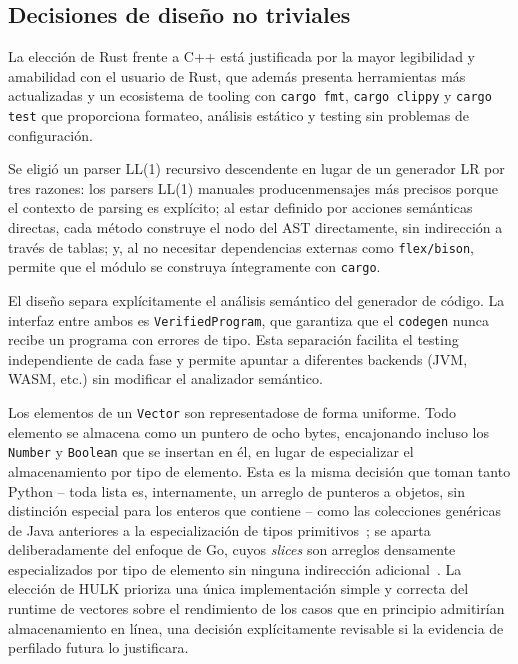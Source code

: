 \documentclass[12pt, a4paper]{article}
\begin{document}
\subsection{Decisiones de dise\~{n}o no triviales}

La elecci\'{o}n de Rust frente a C++ est\'{a} justificada por la mayor legibilidad y amabilidad con el usuario de Rust, que además presenta herramientas más actualizadas y un ecosistema de tooling con \texttt{cargo fmt}, \texttt{cargo clippy} y \texttt{cargo test} que proporciona formateo, an\'{a}lisis est\'{a}tico y testing sin problemas de configuraci\'{o}n.

Se eligi\'{o} un parser LL(1) recursivo descendente en lugar de un generador LR por tres razones: los parsers LL(1) manuales producenmensajes m\'{a}s precisos porque el contexto de parsing es expl\'{i}cito; al estar definido por acciones sem\'{a}nticas directas, cada m\'{e}todo construye el nodo del AST directamente, sin indirecci\'{o}n a trav\'{e}s de tablas; y, al no necesitar dependencias externas como \texttt{flex/bison}, permite que el módulo se construya \'{i}ntegramente con \texttt{cargo}.


El dise\~{n}o separa expl\'{i}citamente el an\'{a}lisis sem\'{a}ntico del generador de
c\'{o}digo. La interfaz entre ambos es \texttt{VerifiedProgram}, que garantiza
que el \texttt{codegen} nunca recibe un programa con errores de tipo. Esta separaci\'{o}n
facilita el testing independiente de cada fase y permite apuntar a diferentes
backends (JVM, WASM, etc.) sin modificar el analizador sem\'{a}ntico.

Los elementos de un \texttt{Vector} son representadose de forma uniforme. Todo elemento se almacena como un puntero de ocho bytes,
encajonando incluso los \texttt{Number} y \texttt{Boolean} que se insertan en
\'{e}l, en lugar de especializar el almacenamiento por tipo de elemento. Esta es
la misma decisi\'{o}n que toman tanto Python -- toda lista es, internamente, un
arreglo de punteros a objetos, sin distinci\'{o}n especial para los enteros que
contiene -- como las colecciones gen\'{e}ricas de Java anteriores a la
especializaci\'{o}n de tipos primitivos~\cite{gosling2021}; se aparta
deliberadamente del enfoque de Go, cuyos \textit{slices} son arreglos
densamente especializados por tipo de elemento sin ninguna indirecci\'{o}n
adicional~\cite{donovan2015}. La elecci\'{o}n de HULK prioriza una \'{u}nica
implementaci\'{o}n simple y correcta del runtime de vectores sobre el
rendimiento de los casos que en principio admitir\'{i}an almacenamiento en
l\'{i}nea, una decisi\'{o}n expl\'{i}citamente revisable si la evidencia de
perfilado futura lo justificara.
\end{document}
